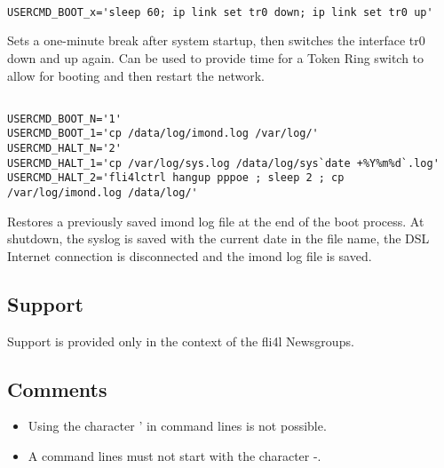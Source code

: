 \begin{verbatim}

USERCMD_BOOT_x='sleep 60; ip link set tr0 down; ip link set tr0 up'
\end{verbatim}
Sets a one-minute break after system startup, then switches the interface tr0 down
and up again. Can be used to provide time for a Token Ring switch
to allow for booting and then restart the network.

\begin{verbatim}

USERCMD_BOOT_N='1'
USERCMD_BOOT_1='cp /data/log/imond.log /var/log/'
USERCMD_HALT_N='2'
USERCMD_HALT_1='cp /var/log/sys.log /data/log/sys`date +%Y%m%d`.log'
USERCMD_HALT_2='fli4lctrl hangup pppoe ; sleep 2 ; cp /var/log/imond.log /data/log/'
\end{verbatim}
Restores a previously saved imond log file at the end of the boot process.
At shutdown, the syslog is saved with the current date in the file name,
the DSL Internet connection is disconnected and the imond log file is saved.

\subsection{Support}
Support is provided only in the context of the fli4l Newsgroups.

\subsection{Comments}
\begin{itemize}
    \item Using the character \glqq{}'\grqq{} in command lines is not possible.
    \item A command lines must not start with the character \glqq{}-\grqq{}.
\end{itemize}
